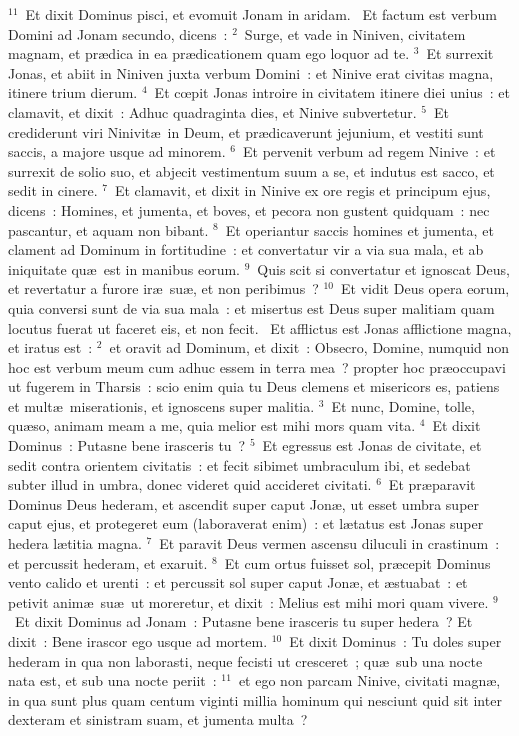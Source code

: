 ${}^{11}$~Et dixit Dominus pisci, et evomuit Jonam in aridam.
~\lettrine[lines=10,image=true,loversize=0.05,lraise=-0.03]{E}{}t factum est verbum Domini ad Jonam secundo, dicens~:
${}^{2}$~Surge, et vade in Niniven, civitatem magnam, et pr\ae dica in ea pr\ae dicationem quam ego loquor ad te.
${}^{3}$~Et surrexit Jonas, et abiit in Niniven juxta verbum Domini~: et Ninive erat civitas magna, itinere trium dierum.
${}^{4}$~Et cœpit Jonas introire in civitatem itinere diei unius~: et clamavit, et dixit~: Adhuc quadraginta dies, et Ninive subvertetur.
${}^{5}$~Et crediderunt viri Ninivit\ae\ in Deum, et pr\ae dicaverunt jejunium, et vestiti sunt saccis, a majore usque ad minorem.
${}^{6}$~Et pervenit verbum ad regem Ninive~: et surrexit de solio suo, et abjecit vestimentum suum a se, et indutus est sacco, et sedit in cinere.
${}^{7}$~Et clamavit, et dixit in Ninive ex ore regis et principum ejus, dicens~: Homines, et jumenta, et boves, et pecora non gustent quidquam~: nec pascantur, et aquam non bibant.
${}^{8}$~Et operiantur saccis homines et jumenta, et clament ad Dominum in fortitudine~: et convertatur vir a via sua mala, et ab iniquitate qu\ae\ est in manibus eorum.
${}^{9}$~Quis scit si convertatur et ignoscat Deus, et revertatur a furore ir\ae\ su\ae , et non peribimus~?
${}^{10}$~Et vidit Deus opera eorum, quia conversi sunt de via sua mala~: et misertus est Deus super malitiam quam locutus fuerat ut faceret eis, et non fecit.
~\lettrine[lines=10,image=true,loversize=0.05,lraise=-0.03]{E}{}t afflictus est Jonas afflictione magna, et iratus est~:
${}^{2}$~et oravit ad Dominum, et dixit~: Obsecro, Domine, numquid non hoc est verbum meum cum adhuc essem in terra mea~? propter hoc pr\ae occupavi ut fugerem in Tharsis~: scio enim quia tu Deus clemens et misericors es, patiens et mult\ae\ miserationis, et ignoscens super malitia.
${}^{3}$~Et nunc, Domine, tolle, qu\ae so, animam meam a me, quia melior est mihi mors quam vita.
${}^{4}$~Et dixit Dominus~: Putasne bene irasceris tu~?
${}^{5}$~Et egressus est Jonas de civitate, et sedit contra orientem civitatis~: et fecit sibimet umbraculum ibi, et sedebat subter illud in umbra, donec videret quid accideret civitati.
${}^{6}$~Et pr\ae paravit Dominus Deus hederam, et ascendit super caput Jon\ae , ut esset umbra super caput ejus, et protegeret eum (laboraverat enim)~: et l\ae tatus est Jonas super hedera l\ae titia magna.
${}^{7}$~Et paravit Deus vermen ascensu diluculi in crastinum~: et percussit hederam, et exaruit.
${}^{8}$~Et cum ortus fuisset sol, pr\ae cepit Dominus vento calido et urenti~: et percussit sol super caput Jon\ae , et \ae stuabat~: et petivit anim\ae\ su\ae\ ut moreretur, et dixit~: Melius est mihi mori quam vivere.
${}^{9}$~Et dixit Dominus ad Jonam~: Putasne bene irasceris tu super hedera~? Et dixit~: Bene irascor ego usque ad mortem.
${}^{10}$~Et dixit Dominus~: Tu doles super hederam in qua non laborasti, neque fecisti ut cresceret~; qu\ae\ sub una nocte nata est, et sub una nocte periit~:
${}^{11}$~et ego non parcam Ninive, civitati magn\ae , in qua sunt plus quam centum viginti millia hominum qui nesciunt quid sit inter dexteram et sinistram suam, et jumenta multa~?
